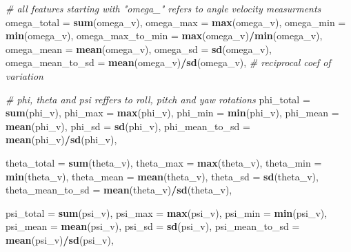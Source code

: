 \documentclass[]{article}
\newenvironment{Shaded}{\begin{snugshade}}{\end{snugshade}}
\newcommand{\CommentTok}[1]{\textcolor[rgb]{0.56,0.35,0.01}{\textit{#1}}}
\newcommand{\DataTypeTok}[1]{\textcolor[rgb]{0.13,0.29,0.53}{#1}}
\newcommand{\KeywordTok}[1]{\textcolor[rgb]{0.13,0.29,0.53}{\textbf{#1}}}
\newcommand{\NormalTok}[1]{#1}
\newcommand{\OperatorTok}[1]{\textcolor[rgb]{0.81,0.36,0.00}{\textbf{#1}}}
\begin{document}
\begin{Shaded}
\begin{Highlighting}[]
{{{{{            \CommentTok{# all features starting with "omega_" refers to angle velocity measurments}
            \DataTypeTok{omega_total =} \KeywordTok{sum}\NormalTok{(omega_v),}
            \DataTypeTok{omega_max =} \KeywordTok{max}\NormalTok{(omega_v),}
            \DataTypeTok{omega_min =} \KeywordTok{min}\NormalTok{(omega_v),}
            \DataTypeTok{omega_max_to_min =} \KeywordTok{max}\NormalTok{(omega_v)}\OperatorTok{/}\KeywordTok{min}\NormalTok{(omega_v),}
            \DataTypeTok{omega_mean =} \KeywordTok{mean}\NormalTok{(omega_v),}
            \DataTypeTok{omega_sd =} \KeywordTok{sd}\NormalTok{(omega_v),}
            \DataTypeTok{omega_mean_to_sd =} \KeywordTok{mean}\NormalTok{(omega_v)}\OperatorTok{/}\KeywordTok{sd}\NormalTok{(omega_v), }\CommentTok{# reciprocal coef of variation}

            \CommentTok{# phi, theta and psi reffers to roll, pitch and yaw rotations}
            \DataTypeTok{phi_total =} \KeywordTok{sum}\NormalTok{(phi_v),}
            \DataTypeTok{phi_max =} \KeywordTok{max}\NormalTok{(phi_v),}
            \DataTypeTok{phi_min =} \KeywordTok{min}\NormalTok{(phi_v),}
            \DataTypeTok{phi_mean =} \KeywordTok{mean}\NormalTok{(phi_v),}
            \DataTypeTok{phi_sd =} \KeywordTok{sd}\NormalTok{(phi_v),}
            \DataTypeTok{phi_mean_to_sd =} \KeywordTok{mean}\NormalTok{(phi_v)}\OperatorTok{/}\KeywordTok{sd}\NormalTok{(phi_v),}
            
            \DataTypeTok{theta_total =} \KeywordTok{sum}\NormalTok{(theta_v),}
            \DataTypeTok{theta_max =} \KeywordTok{max}\NormalTok{(theta_v),}
            \DataTypeTok{theta_min =} \KeywordTok{min}\NormalTok{(theta_v),}
            \DataTypeTok{theta_mean =} \KeywordTok{mean}\NormalTok{(theta_v),}
            \DataTypeTok{theta_sd =} \KeywordTok{sd}\NormalTok{(theta_v),}
            \DataTypeTok{theta_mean_to_sd =} \KeywordTok{mean}\NormalTok{(theta_v)}\OperatorTok{/}\KeywordTok{sd}\NormalTok{(theta_v),}
            
            \DataTypeTok{psi_total =} \KeywordTok{sum}\NormalTok{(psi_v),}
            \DataTypeTok{psi_max =} \KeywordTok{max}\NormalTok{(psi_v),}
            \DataTypeTok{psi_min =} \KeywordTok{min}\NormalTok{(psi_v),}
            \DataTypeTok{psi_mean =} \KeywordTok{mean}\NormalTok{(psi_v),}
            \DataTypeTok{psi_sd =} \KeywordTok{sd}\NormalTok{(psi_v),}
            \DataTypeTok{psi_mean_to_sd =} \KeywordTok{mean}\NormalTok{(psi_v)}\OperatorTok{/}\KeywordTok{sd}\NormalTok{(psi_v),}
            
}}}}}
\end{Highlighting}
\end{Shaded}
\end{document}
